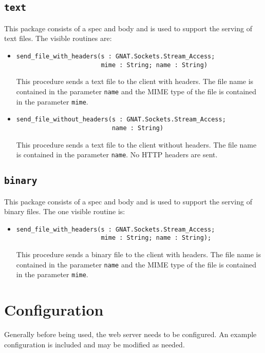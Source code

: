 \documentclass[10pt, openany, draft]{article}
\begin{document}
\subsection{\texttt{text}}
This package consists of a spec and body and is used to support the serving of text files.  The visible routines are:
\begin{itemize}
  \item \begin{verbatim}send_file_with_headers(s : GNAT.Sockets.Stream_Access;
                       mime : String; name : String)
  \end{verbatim}
  This procedure sends a text file to the client with headers.  The file name is contained in the parameter \texttt{name} and the MIME type of the file is contained in the parameter \texttt{mime}.

  \item \begin{verbatim}send_file_without_headers(s : GNAT.Sockets.Stream_Access;
                          name : String)
  \end{verbatim}
  This procedure sends a text file to the client without headers.  The file name is contained in the parameter \texttt{name}.  No HTTP headers are sent.
\end{itemize}

\subsection{\texttt{binary}}
This package consists of a spec and body and is used to support the serving of binary files.  The one visible routine is:
\begin{itemize}
  \item \begin{verbatim}send_file_with_headers(s : GNAT.Sockets.Stream_Access;
                       mime : String; name : String);
            \end{verbatim}
  This procedure sends a binary file to the client with headers.  The file name is contained in the parameter \texttt{name} and the MIME type of the file is contained in the parameter \texttt{mime}.
\end{itemize}

\section{Configuration}
Generally before being used, the web server needs to be configured.  An example configuration is included and may be modified as needed.
\end{document}
